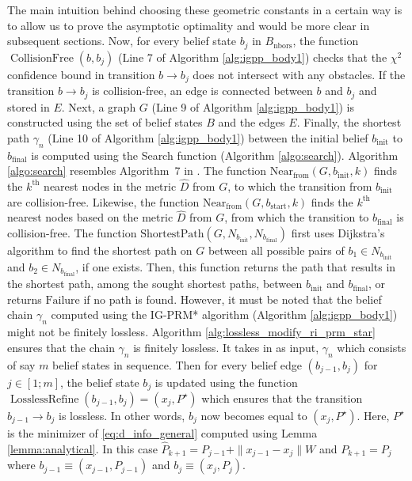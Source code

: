 \documentclass[Afour,sageh,times]{sagej}
\begin{document}
 
The main intuition behind choosing these geometric constants in a certain way is to allow us to prove the asymptotic optimality and would be more clear in subsequent sections. Now, for every belief state $b_j$ in $B_{\text{nbors}}$, the function $\operatorname{CollisionFree}(b, b_j)$ (Line 7 of Algorithm \ref{alg:igpp_body1}) checks that the $\chi^2$ confidence bound in transition $b \rightarrow b_j $ does not intersect with any obstacles. If the transition $b \rightarrow b_j $ is collision-free, an edge is connected between $b$ and $b_j$ and stored in $E$. Next, a graph $G$ (Line 9 of Algorithm \ref{alg:igpp_body1}) is constructed using the set of belief states $B$ and the edges $E$. Finally, the shortest path $\gamma_n$ (Line 10 of Algorithm \ref{alg:igpp_body1}) between the initial belief $b_{\text{init}}$ to $b_{\text{final}}$ is computed using the Search function (Algorithm \ref{algo:search}). 
Algorithm \ref{algo:search} resembles Algorithm~7 in \cite{choset2005principles}. The function $\text{Near}_{\text{from}}(G, b_\text{init},k)$ finds the $k^\text{th}$ nearest nodes in the metric $\hat{D}$ from $G$, to which the transition from $b_{\text{init}}$ are collision-free. Likewise, the function $\text{Near}_{\text{from}}(G, b_\text{start},k)$ finds the $k^\text{th}$ nearest nodes based on the metric $\hat{D}$ from $G$, from which the transition to $b_{\text{final}}$ is collision-free. The function $\text{ShortestPath}(G, N_{b_{\text{init}}}, N_{b_{\text{final}}})$ first uses  Dijkstra's algorithm \cite{dijkstra1959note} to find the shortest path on $G$ between all possible  pairs of   $b_1 \in N_{b_{\text{init}}}$ and $b_2 \in N_{b_{\text{final}}}$, if one exists. Then, this function returns the path that results in the shortest path, among the sought shortest paths, between $b_{\text{init}}$ and $b_{\text{final}}$, or returns $\text{Failure}$ if  no path is found.  However, it must be noted that the belief chain $\gamma_n$ computed using the IG-PRM* algorithm (Algorithm \ref{alg:igpp_body1}) might not be finitely lossless. Algorithm \ref{alg:lossless_modify_ri_prm_star} ensures that the chain $\gamma_n$ is finitely lossless. It takes in as input, $\gamma_n$ which consists of say $m$ belief states in sequence. Then for every belief edge $(b_{j-1},b_j)$ for $j\in[1;m]$, the belief state $b_j$ is updated using the function $\operatorname{LosslessRefine}(b_{j-1},b_j)=(x_j,P^\star)$ which ensures that the transition $b_{j-1}\rightarrow b_j$ is lossless. In other words, $b_j$ now becomes equal to $(x_j,P^\star)$.  Here, $P^\star$ is the minimizer of \eqref{eq:d_info_general} computed using Lemma \ref{lemma:analytical}. In this case $\hat{P}_{k+1}=P_{j-1}+\|x_{j-1}-x_j\|W$ and $P_{k+1}=P_j$ where $b_{j-1}\equiv(x_{j-1},P_{j-1})$ and $b_j\equiv(x_j,P_j)$.
\end{document}
